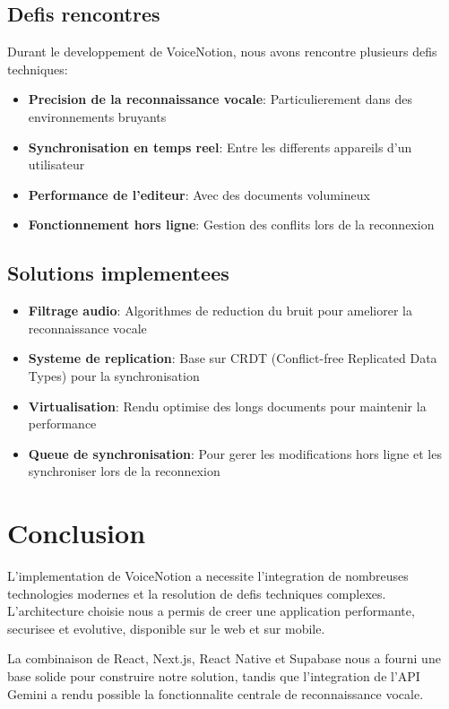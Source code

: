 \subsection{Defis rencontres}
Durant le developpement de VoiceNotion, nous avons rencontre plusieurs defis techniques:
\begin{itemize}
    \item \textbf{Precision de la reconnaissance vocale}: Particulierement dans des environnements bruyants
    \item \textbf{Synchronisation en temps reel}: Entre les differents appareils d'un utilisateur
    \item \textbf{Performance de l'editeur}: Avec des documents volumineux
    \item \textbf{Fonctionnement hors ligne}: Gestion des conflits lors de la reconnexion
\end{itemize}

\subsection{Solutions implementees}
\begin{itemize}
    \item \textbf{Filtrage audio}: Algorithmes de reduction du bruit pour ameliorer la reconnaissance vocale
    \item \textbf{Systeme de replication}: Base sur CRDT (Conflict-free Replicated Data Types) pour la synchronisation
    \item \textbf{Virtualisation}: Rendu optimise des longs documents pour maintenir la performance
    \item \textbf{Queue de synchronisation}: Pour gerer les modifications hors ligne et les synchroniser lors de la reconnexion
\end{itemize}

\section{Conclusion}
L'implementation de VoiceNotion a necessite l'integration de nombreuses technologies modernes et la resolution de defis techniques complexes. L'architecture choisie nous a permis de creer une application performante, securisee et evolutive, disponible sur le web et sur mobile.

La combinaison de React, Next.js, React Native et Supabase nous a fourni une base solide pour construire notre solution, tandis que l'integration de l'API Gemini a rendu possible la fonctionnalite centrale de reconnaissance vocale.

